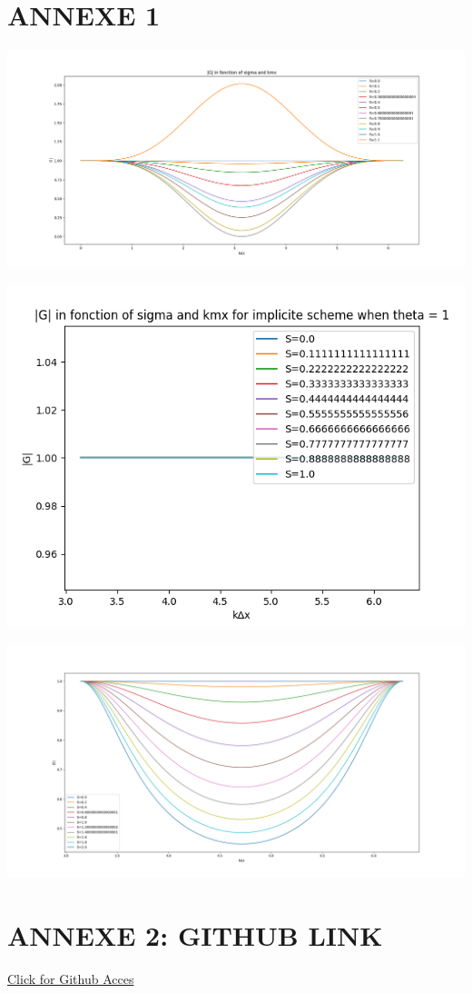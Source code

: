 \documentclass[12pt]{article}
\begin{document}





\newpage

\section{ANNEXE 1}





\vfill
\includegraphics[width=1\textwidth]{sigma_question d.png}
\vfill

\vfill
\includegraphics[width=1\textwidth]{sigma_f_1.png}
\vfill

\vfill
\includegraphics[width=1\textwidth]{sigma_f_05.png}
\vfill

\section{ANNEXE 2: GITHUB LINK}

\href{https://github.com/Kenesis69/MEC_6602E_HOMEWORK_1}{Click for Github Acces}
\end{document}
